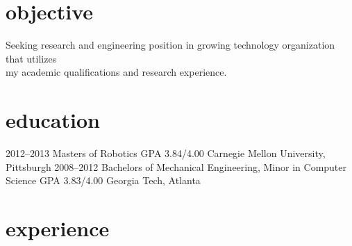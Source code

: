 \documentclass[]{friggeri-cv} %
\begin{document}
\section{objective}
Seeking research and engineering position in growing technology organization that utilizes \\
my academic qualifications and research experience. 


\section{education}

\begin{entrylist}
\eduentry
{2012--2013}
{Masters {\normalfont of Robotics}}
{GPA 3.84/4.00}
{Carnegie Mellon University, Pittsburgh}
\eduentry
{2008--2012}
{Bachelors {\normalfont of Mechanical Engineering, Minor in Computer Science}}
{GPA 3.83/4.00}
{Georgia Tech, Atlanta}
\end{entrylist}

\vspace{-2mm}
\section{experience}
\end{document}
